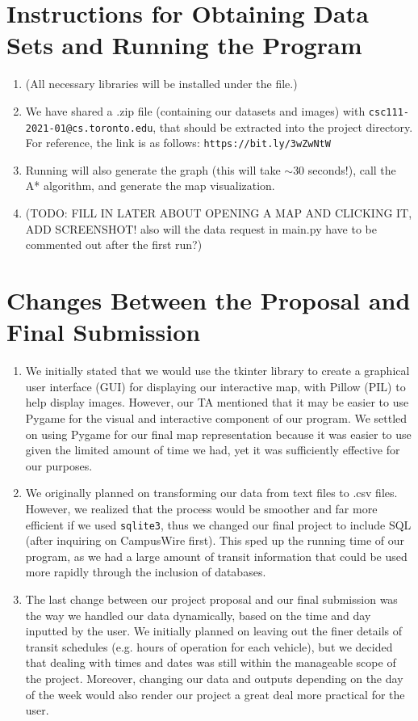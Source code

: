 \documentclass[fontsize=11pt]{article}
\begin{document}
    \section*{Instructions for Obtaining Data Sets and Running the Program}

    \begin{enumerate}
        \item (All necessary libraries will be installed under the  file.)
        \item We have shared a .zip file (containing our datasets and images) with \texttt{csc111-2021-01@cs.toronto.edu}, that should be extracted into the project directory. For reference, the link is as follows: \texttt{https://bit.ly/3wZwNtW}
        \item Running  will also generate the graph (this will take $\sim$30 seconds!), call the A* algorithm, and generate the map visualization.
        \item (TODO: FILL IN LATER ABOUT OPENING A MAP AND CLICKING IT, ADD SCREENSHOT! also will the data request in main.py have to be commented out after the first run?)
    \end{enumerate}

    \section*{Changes Between the Proposal and Final Submission}

    \begin{enumerate}
        \item We initially stated that we would use the tkinter library to create a graphical user interface (GUI) for displaying our interactive map, with Pillow (PIL) to help display images. However, our TA mentioned that it may be easier to use Pygame for the visual and interactive component of our program. We settled on using Pygame for our final map representation because it was easier to use given the limited amount of time we had, yet it was sufficiently effective for our purposes.
        \item We originally planned on transforming our data from text files to .csv files. However, we realized that the process would be smoother and far more efficient if we used \texttt{sqlite3}, thus we changed our final project to include SQL (after inquiring on CampusWire first). This sped up the running time of our program, as we had a large amount of transit information that could be used more rapidly through the inclusion of databases.
        \item The last change between our project proposal and our final submission was the way we handled our data dynamically, based on the time and day inputted by the user. We initially planned on leaving out the finer details of transit schedules (e.g. hours of operation for each vehicle), but we decided that dealing with times and dates was still within the manageable scope of the project. Moreover, changing our data and outputs depending on the day of the week would also render our project a great deal more practical for the user.
    \end{enumerate}
\end{document}
